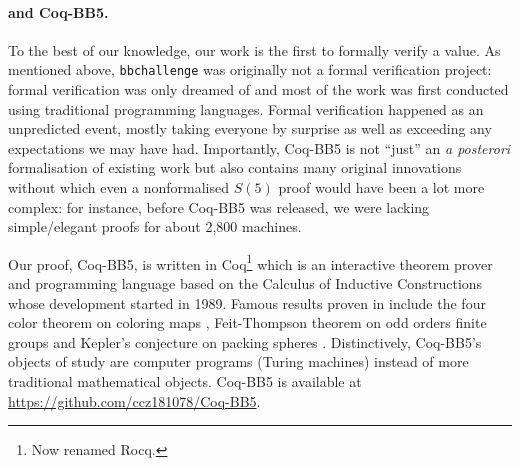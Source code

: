 \documentclass[a4paper,british]{article}
\theoremstyle{definition} %
\numberwithin{equation}{section}
\theoremstyle{definition} %
\newcommand{\ts}[1]{{\color{red}#1}}
\newcommand{\CoqBB}{Coq-BB5\xspace}
\begin{document}


\paragraph{\Coq and \CoqBB.} To the best of our knowledge, our work is the first to formally verify a \BBfull value. As mentioned above, \texttt{bbchallenge} was originally not a formal verification project: formal verification was only dreamed of and most of the work was first conducted using traditional programming languages. Formal verification happened as an unpredicted event, mostly taking everyone by surprise as well as exceeding any expectations we may have had. Importantly, \CoqBB is not ``just'' an \textit{a posterori} formalisation of existing work but also contains many original innovations without which even a nonformalised $S(5)$ proof would have been a lot more complex: for instance, before \CoqBB was released, we were lacking simple/elegant proofs for about 2,800 machines.

Our proof, \CoqBB, is written in Coq\footnote{Now renamed Rocq.} \cite{the_coq_development_team_2024_14542673} which is an interactive theorem prover and programming language based on the Calculus of Inductive Constructions \cite{CoC} whose development started in 1989. Famous results proven in \Coq include the four color theorem on coloring maps \cite{fourColour, fourColourCoq}, Feit-Thompson theorem on odd orders finite groups \cite{feitThompson} and Kepler's conjecture on packing spheres \cite{flyspeck}. Distinctively, \CoqBB's objects of study are computer programs (Turing machines) instead of more traditional mathematical objects. \CoqBB is available at \url{https://github.com/ccz181078/Coq-BB5}.
\end{document}
